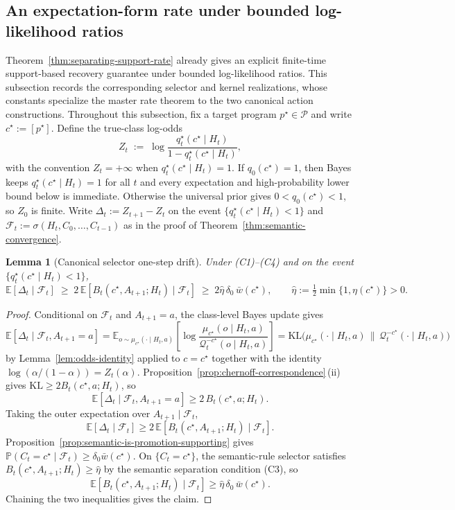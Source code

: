 \documentclass[11pt]{article}
\newtheorem{lemma}[theorem]{Lemma}
\theoremstyle{definition}
\theoremstyle{remark}
\newcommand{\Pcal}{\mathcal{P}}
\newcommand{\Qcal}{\mathcal{Q}}
\newcommand{\E}{\mathbb{E}}
\newcommand{\Prob}{\mathbb{P}}
\newcommand{\KL}{\mathrm{KL}}
\begin{document}
\subsection{An expectation-form rate under bounded log-likelihood ratios}
\label{sec:exp-rate}

Theorem~\ref{thm:separating-support-rate} already gives an explicit finite-time support-based recovery guarantee under bounded log-likelihood ratios. This subsection records the corresponding selector and kernel realizations, whose constants specialize the master rate theorem to the two canonical action constructions. Throughout this subsection, fix a target program $p^\star\in\Pcal$ and write $c^\star:=[p^\star]$. Define the true-class log-odds
\[
Z_t\;:=\;\log\frac{q_t^\star(c^\star\mid H_t)}{1-q_t^\star(c^\star\mid H_t)},
\]
with the convention $Z_t=+\infty$ when $q_t^\star(c^\star\mid H_t)=1$. If $q_0(c^\star)=1$, then Bayes keeps $q_t^\star(c^\star\mid H_t)=1$ for all $t$ and every expectation and high-probability lower bound below is immediate. Otherwise the universal prior gives $0<q_0(c^\star)<1$, so $Z_0$ is finite. Write $\Delta_t:=Z_{t+1}-Z_t$ on the event $\{q_t^\star(c^\star\mid H_t)<1\}$ and $\mathcal F_t:=\sigma(H_t,C_0,\dots,C_{t-1})$ as in the proof of Theorem~\ref{thm:semantic-convergence}.

\begin{lemma}[Canonical selector one-step drift]
\label{lem:one-step-drift}
Under \textup{(C1)--(C4)} and on the event $\{q_t^\star(c^\star\mid H_t)<1\}$,
\[
\E[\Delta_t\mid\mathcal F_t]
\;\ge\;
2\,\E[B_t(c^\star,A_{t+1};H_t)\mid\mathcal F_t]
\;\ge\;
2\hat\eta\,\delta_0\,\bar w(c^\star),
\qquad
\hat\eta:=\tfrac{1}{2}\min\{1,\eta(c^\star)\}>0.
\]
\end{lemma}

\begin{proof}
Conditional on $\mathcal F_t$ and $A_{t+1}=a$, the class-level Bayes update gives
\[
\E[\Delta_t\mid\mathcal F_t,A_{t+1}=a]
=
\E_{o\sim\mu_{c^\star}(\cdot\mid H_t,a)}\!\left[
\log\frac{\mu_{c^\star}(o\mid H_t,a)}{\Qcal_t^{-c^\star}(o\mid H_t,a)}
\right]
=\KL\!\bigl(\mu_{c^\star}(\cdot\mid H_t,a)\,\|\,\Qcal_t^{-c^\star}(\cdot\mid H_t,a)\bigr)
\]
by Lemma~\ref{lem:odds-identity} applied to $c=c^\star$ together with the identity $\log(\alpha/(1-\alpha))=Z_t(\alpha)$. Proposition~\ref{prop:chernoff-correspondence}\,(ii) gives $\KL\ge 2B_t(c^\star,a;H_t)$, so
\[
\E[\Delta_t\mid\mathcal F_t,A_{t+1}=a]\ge 2\,B_t(c^\star,a;H_t).
\]
Taking the outer expectation over $A_{t+1}\mid\mathcal F_t$,
\[
\E[\Delta_t\mid\mathcal F_t]\ge 2\,\E[B_t(c^\star,A_{t+1};H_t)\mid\mathcal F_t].
\]
Proposition~\ref{prop:semantic-is-promotion-supporting} gives $\Prob(C_t=c^\star\mid\mathcal F_t)\ge\delta_0\bar w(c^\star)$. On $\{C_t=c^\star\}$, the semantic-rule selector satisfies $B_t(c^\star,A_{t+1};H_t)\ge\hat\eta$ by the semantic separation condition (C3), so
\[
\E[B_t(c^\star,A_{t+1};H_t)\mid\mathcal F_t]\ge\hat\eta\,\delta_0\,\bar w(c^\star).
\]
Chaining the two inequalities gives the claim.
\end{proof}
\end{document}
